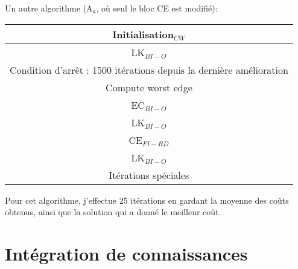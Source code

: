 \documentclass[a4paper,11pt]{article}%
\begin{document}
Un autre algorithme (A$_a$, où seul le bloc CE est modifié):
\begin{center}
\begin{tabular}{|c|}

   \hline
   Initialisation$_{CW}$  \\
   \hline
   LK$_{BI-O}$ \\
   \hline
   \hline
   Condition d'arrêt : 1500 itérations depuis la dernière amélioration  \\
   \hline
   Compute worst edge \\
   \hline
   EC$_{BI-O}$ \\
   \hline
   LK$_{BI-O}$ \\
   \hline
   CE$_{FI-RD}$ \\
   \hline
   LK$_{BI-O}$ \\
   \hline
   Itérations spéciales \\
   \hline
   \hline
   
\end{tabular}
\end{center}

Pour cet algorithme, j'effectue $25$ itérations en gardant la moyenne des coûts obtenus, ainsi que la solution qui a donné le meilleur coût.

\section{Intégration de connaissances}




\end{document}
